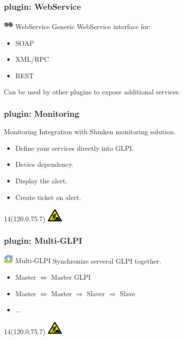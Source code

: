 \documentclass{beamer}
\newcommand{\WorkInProgress}{%
\begin{textblock}{14}(120.0,75.7)
\includegraphics[height=0.7cm]{./pics/workinprogress.jpg}
\end{textblock}
  }
\begin{document}
\begin{frame}
    \frametitle{plugin: WebService}

    \begin{block}{\includegraphics[height=0.5cm]{./pics/plugins/webservice.jpg} WebService}
        Generic WebService interface for:
        \begin{itemize}
            \item SOAP
            \item XML/RPC
            \item REST
        \end{itemize}
        Can be used by other plugins to expose additional services.
    \end{block}

\end{frame}


\begin{frame}
    \frametitle{plugin: Monitoring}

    \begin{block}{Monitoring}
        Integration with Shinken monitoring solution.
        \begin{itemize}
            \item Define your services directly into GLPI.
            \item Device dependency.
            \item Display the alert.
            \item Create ticket on alert.
        \end{itemize}
    \end{block}
\WorkInProgress
\end{frame}


\begin{frame}
    \frametitle{plugin: Multi-GLPI}

    \begin{block}{\includegraphics[height=0.5cm]{./pics/plugins/multiglpi.jpg} Multi-GLPI}
        Synchronize serveral GLPI together.
        \begin{itemize}
            \item Master $\Longleftrightarrow$ Master GLPI
            \item Master $\Longleftrightarrow$ Master $\Longrightarrow$ Slaver $\Longrightarrow$ Slave
            \item ...
        \end{itemize}
    \end{block}


\WorkInProgress
\end{frame}
\end{document}
